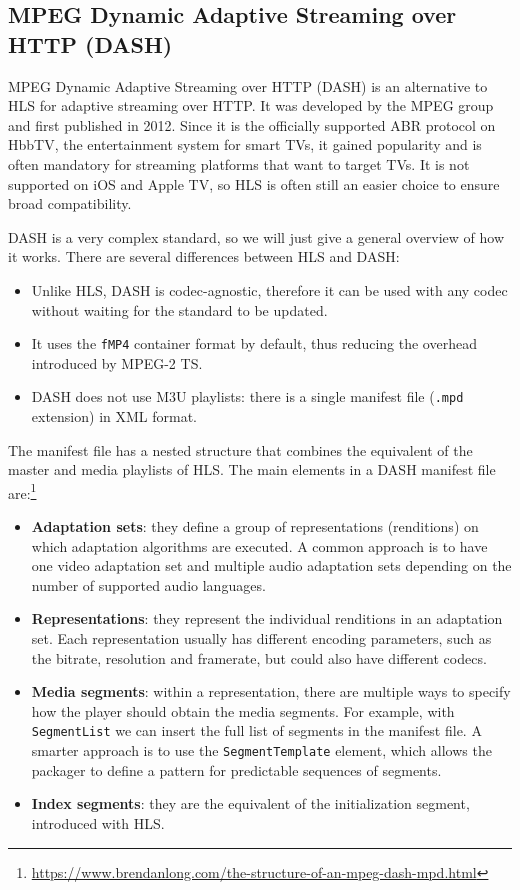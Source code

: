 \subsection{MPEG Dynamic Adaptive Streaming over HTTP (DASH)}
\label{sec:bg/technologies/dash}

MPEG Dynamic Adaptive Streaming over HTTP (DASH) is an alternative to HLS for adaptive streaming over HTTP. It was developed by the MPEG group and first published in 2012. Since it is the officially supported ABR protocol on HbbTV, the entertainment system for smart TVs, it gained popularity and is often mandatory for streaming platforms that want to target TVs. It is not supported on iOS and Apple TV, so HLS is often still an easier choice to ensure broad compatibility.

DASH is a very complex standard, so we will just give a general overview of how it works.\cite{dash}\cite{dash2} There are several differences between HLS and DASH:

\begin{itemize}
    \item Unlike HLS, DASH is codec-agnostic, therefore it can be used with any codec without waiting for the standard to be updated.
    \item It uses the \texttt{fMP4} container format by default, thus reducing the overhead introduced by MPEG-2 TS.
    \item DASH does not use M3U playlists: there is a single manifest file (\texttt{.mpd} extension) in XML format.
\end{itemize}

The manifest file has a nested structure that combines the equivalent of the master and media playlists of HLS. The main elements in a DASH manifest file are:\footnote{\url{https://www.brendanlong.com/the-structure-of-an-mpeg-dash-mpd.html}}

\begin{itemize}
    \item \textbf{Adaptation sets}: they define a group of representations (renditions) on which adaptation algorithms are executed. A common approach is to have one video adaptation set and multiple audio adaptation sets depending on the number of supported audio languages.
    \item \textbf{Representations}: they represent the individual renditions in an adaptation set. Each representation usually has different encoding parameters, such as the bitrate, resolution and framerate, but could also have different codecs.
    \item \textbf{Media segments}: within a representation, there are multiple ways to specify how the player should obtain the media segments. For example, with \texttt{SegmentList} we can insert the full list of segments in the manifest file. A smarter approach is to use the \texttt{SegmentTemplate} element, which allows the packager to define a pattern for predictable sequences of segments.
    \item \textbf{Index segments}: they are the equivalent of the initialization segment, introduced with HLS.
\end{itemize}

